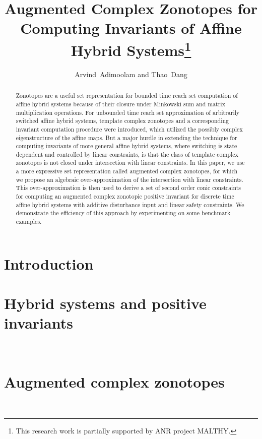 \documentclass{llncs}
\title{Augmented Complex Zonotopes for Computing Invariants of Affine Hybrid Systems\thanks{This research work is partially supported by ANR project MALTHY.}
}
\author{Arvind\ Adimoolam and Thao\ Dang
}
\institute{\ Verimag,~Grenoble, France\\ \url{{santosh.adimoolam,thao.dang}@univ-grenoble-alpes.fr}.
}
\begin{document}
\maketitle

\begin{abstract}
Zonotopes are a useful set representation for bounded time reach set
computation of affine hybrid systems because of their closure under
Minkowski sum and matrix multiplication operations.  For unbounded
time reach set approximation of arbitrarily switched affine hybrid
systems, template complex zonotopes and a corresponding invariant
computation procedure were introduced, which utilized the possibly
complex eigenstructure of the affine maps.  But a major hurdle in
extending the technique for computing invariants of more general
affine hybrid systems, where switching is state dependent and
controlled by linear constraints, is that the class of template
complex zonotopes is not closed under intersection with linear
constraints.  In this paper, we use a more expressive set
representation called augmented complex zonotopes, for which we
propose an algebraic over-approximation of the intersection with
linear constraints.  This over-approximation is then used to derive a
set of second order conic constraints for computing an augmented
complex zonotopic positive invariant for discrete time affine hybrid
systems with additive disturbance input and linear safety constraints.
We demonstrate the efficiency of this approach by experimenting on
some benchmark examples.
\end{abstract}

\section{Introduction}


\section{Hybrid systems and positive invariants}~\label{sec:system}




\section{Augmented complex zonotopes}~\label{sec:acz}


\end{document}
